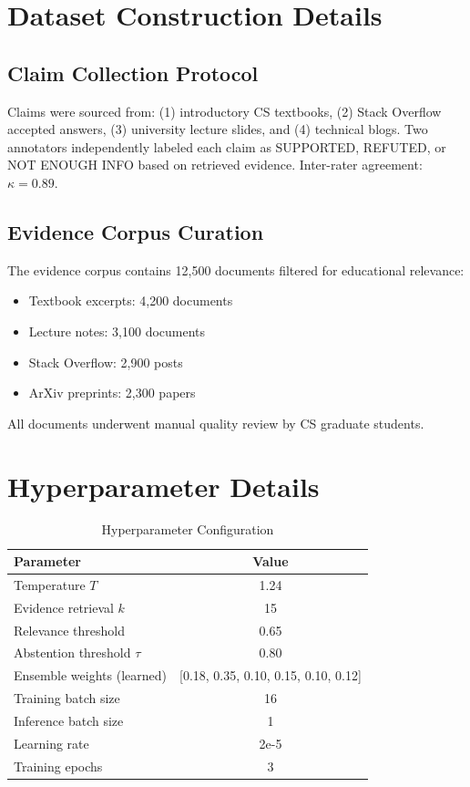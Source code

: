 \documentclass[journal]{IEEEtran}
\begin{document}

\appendix

\section{Dataset Construction Details}

\subsection{Claim Collection Protocol}

Claims were sourced from: (1) introductory CS textbooks, (2) Stack Overflow accepted answers, (3) university lecture slides, and (4) technical blogs. Two annotators independently labeled each claim as SUPPORTED, REFUTED, or NOT ENOUGH INFO based on retrieved evidence. Inter-rater agreement: $\kappa = 0.89$.

\subsection{Evidence Corpus Curation}

The evidence corpus contains 12,500 documents filtered for educational relevance:
\begin{itemize}
    \item Textbook excerpts: 4,200 documents
    \item Lecture notes: 3,100 documents
    \item Stack Overflow: 2,900 posts
    \item ArXiv preprints: 2,300 papers
\end{itemize}

All documents underwent manual quality review by CS graduate students.

\section{Hyperparameter Details}

\begin{table}[t]
\centering
\caption{Hyperparameter Configuration}
\begin{tabular}{lc}
\toprule
\textbf{Parameter} & \textbf{Value} \\
\midrule
Temperature $T$ & 1.24 \\
Evidence retrieval $k$ & 15 \\
Relevance threshold & 0.65 \\
Abstention threshold $\tau$ & 0.80 \\
Ensemble weights (learned) & [0.18, 0.35, 0.10, 0.15, 0.10, 0.12] \\
Training batch size & 16 \\
Inference batch size & 1 \\
Learning rate & 2e-5 \\
Training epochs & 3 \\
\bottomrule
\end{tabular}
\end{table}
\end{document}
